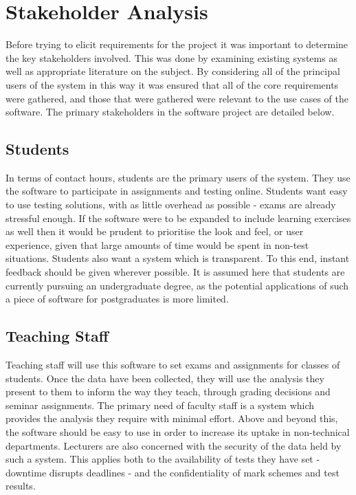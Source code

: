 \documentclass[12pt,a4paper,twoside]{report}
\begin{document}
\section{Stakeholder Analysis}
Before trying to elicit requirements for the project it was important to determine the key stakeholders involved. This was done by examining existing systems as well as appropriate literature on the subject. By considering all of the principal users of the system in this way it was ensured that all of the core requirements were gathered, and those that were gathered were relevant to the use cases of the software. The primary stakeholders in the software project are detailed below.

\subsection{Students}
In terms of contact hours, students are the primary users of the system. They use the software to participate in assignments and testing online. Students want easy to use testing solutions, with as little overhead as possible - exams are already stressful enough. If the software were to be expanded to include learning exercises as well then it would be prudent to prioritise the look and feel, or user experience, given that large amounts of time would be spent in non-test situations. Students also want a system which is transparent. To this end, instant feedback should be given wherever possible. It is assumed here that students are currently pursuing an undergraduate degree, as the potential applications of such a piece of software for postgraduates is more limited.

\subsection{Teaching Staff}
Teaching staff will use this software to set exams and assignments for classes of students. Once the data have been collected, they will use the analysis they present to them to inform the way they teach, through grading decisions and seminar assignments. The primary need of faculty staff is a system which provides the analysis they require with minimal effort. Above and beyond this, the software should be easy to use in order to increase its uptake in non-technical departments. Lecturers are also concerned with the security of the data held by such a system. This applies both to the availability of tests they have set - downtime disrupts deadlines - and the confidentiality of mark schemes and test results.
\end{document}
